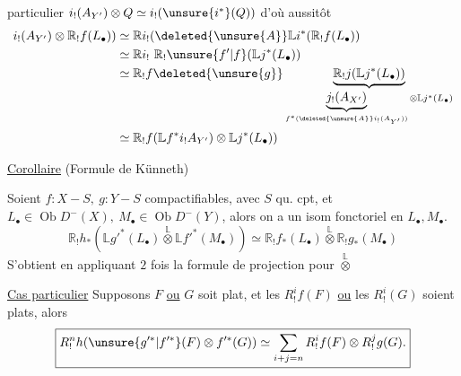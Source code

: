 particulier $i_!(A_{Y'})\otimes Q\simeq i_!(\unsure{i^*}(Q))$ d'où aussitôt
\[
\begin{aligned}
i_!(A_{Y'})\otimes\mathbb R_!f(L_\bullet))
&\simeq\mathbb Ri_!(\deleted{\unsure{A}}\mathbb Li^*(\mathbb R_!f(L_\bullet))\\
&\simeq\mathbb Ri_!\ \mathbb R_!\unsure{f'|f}(\mathbb Lj^*(L_\bullet))\\
&\simeq\mathbb R_!f\deleted{\unsure{g}}
\underbrace{\mathbb R_!j(\mathbb Lj^*(L_\bullet))}_{
\underbrace{j_!(A_{X'})}_{f^*(\deleted{\unsure{A}}i_!(A_{Y'}))}\otimes\mathbb Lj^*(L_\bullet)}\\
&\simeq\mathbb R_!f(\mathbb Lf^*i_!A_{Y'})\otimes\mathbb Lj^*(L_\bullet))
\end{aligned}
\]

\uline{Corollaire} (Formule de Künneth)

Soient $f:X-S,\ g:Y-S$ compactifiables, avec
$S$ qu. cpt, et $L_\bullet\in\operatorname{Ob}D^-(X),\ M_\bullet\in\operatorname{Ob}D^-(Y)$,
alors on a un isom fonctoriel en $L_\bullet,M_\bullet$.
\[
\boxed{\mathbb R_!h_*(\mathbb Lg'^*(L_\bullet)\overset{\mathbb L}{\otimes}\mathbb Lf'^*(M_\bullet))
\simeq\mathbb R_!f_*(L_\bullet)\overset{\mathbb L}{\otimes}\mathbb R_!g_*(M_\bullet)}
\]
S'obtient en appliquant $2$ fois la formule
de projection pour $\overset{\mathbb L}{\otimes}$

\uline{Cas particulier} Supposons
$F$ \uline{ou} $G$ soit plat, et
les $R_!^if(F)$ \uline{ou} les $R_!^i(G)$ soient plats, alors
\[
\boxed{R_!^nh(\unsure{g'^*|f'^*}(F)\otimes f'^*(G))\simeq
\sum_{i+j=n}R_!^if(F)\otimes R_!^jg(G).}
\]
